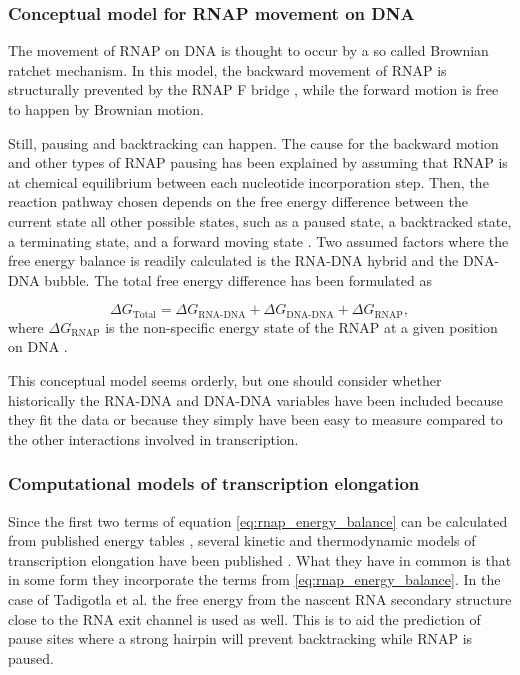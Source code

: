 %

\subsubsection{Conceptual model for RNAP movement on DNA}
The movement of RNAP on DNA is thought to occur by a so called Brownian ratchet
mechanism. In this model, the backward movement of RNAP is structurally
prevented by the RNAP F bridge \cite{bar-nahum_ratchet_2005}, while the forward
motion is free to happen by Brownian motion.

Still, pausing and backtracking can happen. The cause for the backward motion
and other types of RNAP pausing has been explained by assuming that RNAP is at
chemical equilibrium between each nucleotide incorporation step. Then, the
reaction pathway chosen depends on the free energy difference between the
current state all other possible states, such as a paused state, a backtracked
state, a terminating state, and a forward moving state
\cite{greive_thinking_2005}. Two assumed factors where the free energy balance
is readily calculated is the RNA-DNA hybrid and the DNA-DNA bubble. The total
free energy difference has been formulated as

\begin{equation}
	\Delta G_{\text{Total}} = \Delta G_{\text{RNA-DNA}} + \Delta
	G_{\text{DNA-DNA}} + \Delta G_{\text{RNAP}},
	\label{eq:rnap_energy_balance}
\end{equation}
where $\Delta G_{\text{RNAP}}$ is the non-specific energy state of the RNAP at
a given position on DNA \cite{greive_thinking_2005}.

This conceptual model seems orderly, but one should consider whether
historically the RNA-DNA and DNA-DNA variables have been included because they
fit the data or because they simply have been easy to measure compared to the
other interactions involved in transcription.

\subsubsection{Computational models of transcription elongation}
Since the first two terms of equation \eqref{eq:rnap_energy_balance} can be
calculated from published energy tables \cite{wu_temperature_2002, 
santalucia_thermodynamics_2004}, several kinetic and thermodynamic models
of transcription elongation have been published
\cite{tadigotla_thermodynamic_2006-1, bai_sequence-dependent_2004,
guajardo_model_1997}. What they have in common is that in some form they
incorporate the terms from \eqref{eq:rnap_energy_balance}. In the case of
Tadigotla et al. \cite{tadigotla_thermodynamic_2006-1} the free energy from the
nascent RNA secondary structure close to the RNA exit channel is used as well.
This is to aid the prediction of pause sites where a strong hairpin will
prevent backtracking while RNAP is paused.

